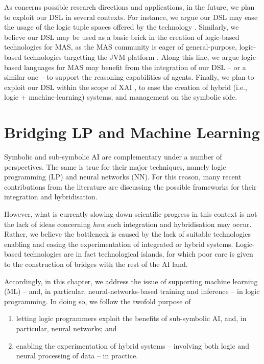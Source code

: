 \documentclass[12pt,a4paper,openright,twoside]{book}
\begin{document}
As concerns possible research directions and applications, in the future, we plan to exploit our DSL in several contexts.
%
For instance, we argue our DSL may ease the usage of the logic tuple spaces offered by the \tusow{} technology \cite{tusow-icccn2019}.
%
Similarly, we believe our DSL may be used as a basic brick in the creation of logic-based technologies for MAS, as the MAS community is eager of general-purpose, logic-based technologies targetting the JVM platform \cite{lptech4mas-jaamas35}.
%
Along this line, we argue logic-based languages for MAS may benefit from the integration of our DSL -- or a similar one -- to support the reasoning capabilities of agents.
%
Finally, we plan to exploit our DSL within the scope of XAI \cite{xaisurvey-ia14}, to ease the creation of hybrid (i.e., logic + machine-learning) systems, and management on the symbolic side.


\chapter{Bridging LP and Machine Learning}
\label{chap:mllib}


Symbolic and sub-symbolic AI are complementary under a number of perspectives.
%
The same is true for their major techniques, namely logic programming (LP) and neural networks (NN).
%
For this reason, many recent contributions from the literature are discussing the possible frameworks for their integration and hybridisation.

However, what is currently slowing down scientific progress in this context is not the lack of ideas concerning \emph{how} such integration and hybridisation may occur.
%
Rather, we believe the bottleneck is caused by the lack of suitable technologies enabling and easing the experimentation of integrated or hybrid systems.
%
Logic-based technologies are in fact technological islands, for which poor care is given to the construction of bridges with the rest of the AI land.

Accordingly, in this chapter, we address the issue of supporting machine learning (ML) -- and, in particular, neural-networks-based training and inference -- in logic programming.
%
In doing so, we follow the twofold purpose of
%
\begin{enumerate}
    \item letting logic programmers exploit the benefits of sub-symbolic AI, and, in particular, neural networks; and
    \item enabling the experimentation of hybrid systems -- involving both logic and neural processing of data -- in practice.
\end{enumerate}
\end{document}
